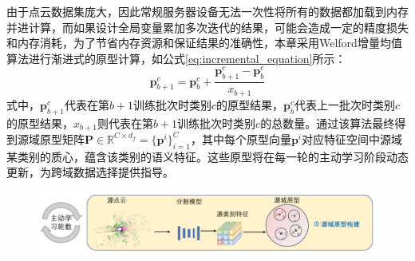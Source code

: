 由于点云数据集庞大，因此常规服务器设备无法一次性将所有的数据都加载到内存并进计算，而如果设计全局变量累加多次迭代的结果，可能会造成一定的精度损失和内存消耗，为了节省内存资源和保证结果的准确性，本章采用Welford增量均值算法进行渐进式的原型计算，如公式\eqref{eq:incremental_equation}所示：
\begin{equation}
\label{eq:incremental_equation}
    \mathbf{p}_{b+1}^c = \mathbf{p}_b^c + \frac{\mathbf{p}_{b+1}^c - \mathbf{p}_b^c}{x_{b+1}}
\end{equation}
式中，\(\mathbf{p}_{b+1}^c\)代表在第\(b+1\)训练批次时类别\(c\)的原型结果，\(\mathbf{p}_{b}^c\)代表上一批次时类别\(c\)的原型结果，\( x_{b+1} \)则代表在第\( b+1 \)训练批次时类别\( c \)的总数量。通过该算法最终得到源域原型矩阵\( \mathbf{P} \in \mathbb{R}^{C \times {d_f}} = \{\mathbf{p}^i\}^C_{i=1} \)，其中每个原型向量\(\mathbf{p}^i\)对应特征空间中源域某类别的质心，蕴含该类别的语义特征。这些原型将在每一轮的主动学习阶段动态更新，为跨域数据选择提供指导。

\vspace{-0.1cm}
\begin{figure}[h]
    \centering
    \includegraphics[width = \textwidth]{ljx/figure/3-2.pdf}
    \label{fig:3-2}
\end{figure}
\vspace{-0.35cm}


